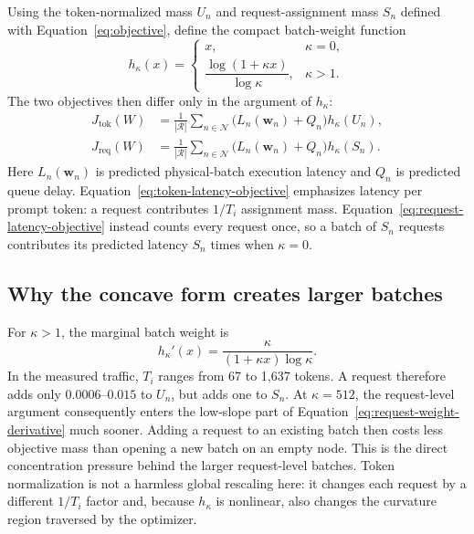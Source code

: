 \documentclass[10pt]{article}
\begin{document}
Using the token-normalized mass $U_n$ and request-assignment mass $S_n$
defined with Equation~\ref{eq:objective}, define the compact batch-weight
function
\begin{equation}
h_\kappa(x)=
\begin{cases}
x, & \kappa=0,\\[0.2em]
\dfrac{\log(1+\kappa x)}{\log\kappa}, & \kappa>1.
\end{cases}
\label{eq:request-weight}
\end{equation}
The two objectives then differ only in the argument of $h_\kappa$:
\begin{align}
J_{\mathrm{tok}}(W)
  &=\frac{1}{|\mathcal R|}\sum_{n\in\mathcal N}
    \bigl(L_n(\mathbf w_n)+Q_n\bigr)h_\kappa(U_n),
    \label{eq:token-latency-objective}\\
J_{\mathrm{req}}(W)
  &=\frac{1}{|\mathcal R|}\sum_{n\in\mathcal N}
    \bigl(L_n(\mathbf w_n)+Q_n\bigr)h_\kappa(S_n).
    \label{eq:request-latency-objective}
\end{align}
Here $L_n(\mathbf w_n)$ is predicted physical-batch execution latency and
$Q_n$ is predicted queue delay. Equation~\ref{eq:token-latency-objective}
emphasizes latency per prompt token: a request contributes $1/T_i$ assignment
mass. Equation~\ref{eq:request-latency-objective} instead counts every request
once, so a batch of $S_n$ requests contributes its predicted latency $S_n$
times when $\kappa=0$.

\subsection{Why the concave form creates larger batches}

For $\kappa>1$, the marginal batch weight is
\begin{equation}
h_\kappa'(x)=\frac{\kappa}{(1+\kappa x)\log\kappa}.
\label{eq:request-weight-derivative}
\end{equation}
In the measured traffic, $T_i$ ranges from 67 to 1,637 tokens. A request
therefore adds only $0.0006$--$0.015$ to $U_n$, but adds one to $S_n$.
At $\kappa=512$, the request-level argument consequently enters the low-slope
part of Equation~\ref{eq:request-weight-derivative} much sooner. Adding a
request to an existing batch then costs less objective mass than opening a new
batch on an empty node. This is the direct concentration pressure behind the
larger request-level batches. Token normalization is not a harmless global
rescaling here: it changes each request by a different $1/T_i$ factor and,
because $h_\kappa$ is nonlinear, also changes the curvature region traversed
by the optimizer.
\end{document}
